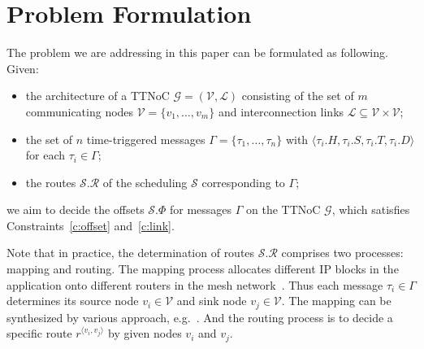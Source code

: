 \documentclass[journal]{IEEEtran}
\newcommand{\calG}{\mathcal{G}}
\newcommand{\calV}{\mathcal{V}}
\newcommand{\calL}{\mathcal{L}}
\newcommand{\calS}{\mathcal{S}}
\newcommand{\calR}{\mathcal{R}}
\newcommand{\route}[3]{#1^{\langle #2,#3\rangle}}
\theoremstyle{remark}
\begin{document}
\section{Problem Formulation\label{s:formulation}}
The problem we are addressing in this paper can be formulated as
following. Given:
\begin{itemize}
\item the architecture of a TTNoC $\calG=(\calV,\calL)$ consisting of
  the set of $m$ communicating nodes $\calV=\{v_{1},\dots,v_{m}\}$ and
  interconnection links $\calL \subseteq \calV \times \calV$;
\item the set of $n$ time-triggered messages $\Gamma =
  \{\tau_{1},\dots,\tau_{n} \}$ with $\langle \tau_{i}.H,\tau_{i}.S,
  \tau_{i}.T, \tau_{i}.D\rangle$ for each $\tau_i \in \Gamma$;
\item the routes $\calS.\calR$ of the scheduling $\calS$ corresponding
  to $\Gamma$;
\end{itemize}
we aim to decide the offsets $\calS.\Phi$ for messages $\Gamma$ on the
TTNoC $\calG$, which satisfies Constraints~\ref{c:offset}
and~\ref{c:link}.

Note that in practice, the determination of routes $\calS.\calR$
comprises two processes: mapping and routing. 
The mapping process
allocates different IP blocks in the application onto different routers in the mesh network~\cite{DBLP:journals/tjs/WangLY16}.
Thus each message $\tau_i\in\Gamma$ determines its source node
$v_i\in\calV$ and sink node $v_j\in\calV$. 
The mapping can be synthesized
by various approach, e.g.~\cite{DBLP:conf/recosoc/MesidisI11,DBLP:journals/ieiceee/WangLYS16}.  
And the
routing process is to decide a specific route $\route{r}{v_i}{v_j}$ by
given nodes $v_i$ and $v_j$.

\end{document}
